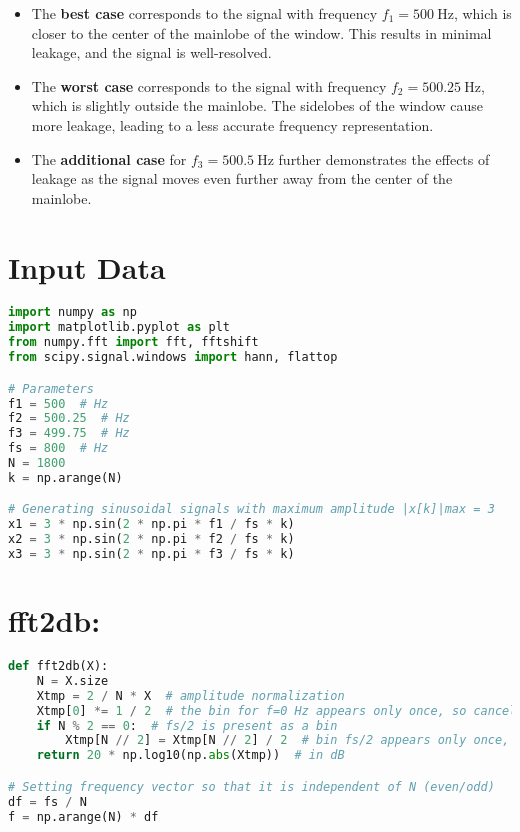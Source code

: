 \documentclass[12pt]{article}
\begin{document}
\begin{itemize}
    \item The \textbf{best case} corresponds to the signal with frequency \(f_1 = 500 \ \text{Hz}\), which is closer to the center of the mainlobe of the window. This results in minimal leakage, and the signal is well-resolved.
    \item The \textbf{worst case} corresponds to the signal with frequency \(f_2 = 500.25 \ \text{Hz}\), which is slightly outside the mainlobe. The sidelobes of the window cause more leakage, leading to a less accurate frequency representation.
    \item The \textbf{additional case} for \(f_3 = 500.5 \ \text{Hz}\) further demonstrates the effects of leakage as the signal moves even further away from the center of the mainlobe.
\end{itemize}

\section{Input Data}
\begin{lstlisting}[language=Python, breaklines=true]
import numpy as np
import matplotlib.pyplot as plt
from numpy.fft import fft, fftshift
from scipy.signal.windows import hann, flattop

# Parameters
f1 = 500  # Hz
f2 = 500.25  # Hz
f3 = 499.75  # Hz
fs = 800  # Hz
N = 1800
k = np.arange(N)

# Generating sinusoidal signals with maximum amplitude |x[k]|max = 3
x1 = 3 * np.sin(2 * np.pi * f1 / fs * k)
x2 = 3 * np.sin(2 * np.pi * f2 / fs * k)
x3 = 3 * np.sin(2 * np.pi * f3 / fs * k)
\end{lstlisting}

\section*{fft2db:}
\begin{lstlisting}[language=Python, breaklines=true]
def fft2db(X):
    N = X.size
    Xtmp = 2 / N * X  # amplitude normalization
    Xtmp[0] *= 1 / 2  # the bin for f=0 Hz appears only once, so cancel *2
    if N % 2 == 0:  # fs/2 is present as a bin
        Xtmp[N // 2] = Xtmp[N // 2] / 2  # bin fs/2 appears only once, so cancel *2
    return 20 * np.log10(np.abs(Xtmp))  # in dB

# Setting frequency vector so that it is independent of N (even/odd)
df = fs / N
f = np.arange(N) * df
\end{lstlisting}
\end{document}
